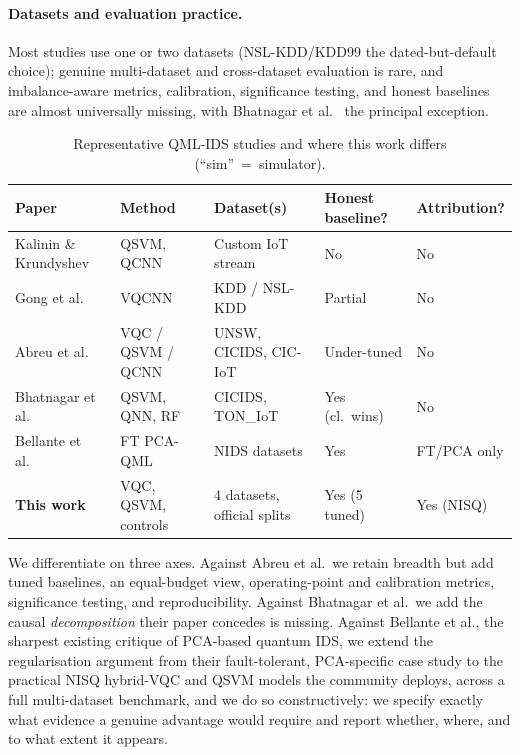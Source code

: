\documentclass[preprint,11pt]{elsarticle}
\begin{document}
\paragraph{Datasets and evaluation practice.}
Most studies use one or two datasets (NSL-KDD/KDD99 the dated-but-default choice); genuine
multi-dataset and cross-dataset evaluation is rare, and imbalance-aware metrics, calibration,
significance testing, and honest baselines are almost universally missing, with
Bhatnagar et al.~\cite{bhatnagar2026mqe} the principal exception.

\begin{table}[t]
\centering
\caption{Representative QML-IDS studies and where this work differs (``sim''~=~simulator).}
\label{tab:related}
\footnotesize
\renewcommand{\arraystretch}{1.2}
\setlength{\tabcolsep}{3pt}
\begin{tabularx}{\textwidth}{@{}L{2.25cm} L{2.1cm} Y C{1.85cm} C{1.95cm}@{}}
\toprule
\textbf{Paper} & \textbf{Method} & \textbf{Dataset(s)} & \textbf{Honest baseline?} & \textbf{Attribution?}\\
\midrule
Kalinin \& Krundyshev \cite{kalinin2022} & QSVM, QCNN & Custom IoT stream & No & No\\
\addlinespace[2pt]
Gong et al.~\cite{gong2024vqcnn} & VQCNN & KDD / NSL-KDD & Partial & No\\
\addlinespace[2pt]
Abreu et al.~\cite{abreu2024qmlids,abreu2025quantumnetsec} & VQC / QSVM / QCNN & UNSW, CICIDS, CIC-IoT & Under-tuned & No\\
\addlinespace[2pt]
Bhatnagar et al.~\cite{bhatnagar2026mqe} & QSVM, QNN, RF & CICIDS, TON\_IoT & Yes (cl.\ wins) & No\\
\addlinespace[2pt]
Bellante et al.~\cite{bellante2025pca} & FT PCA-QML & NIDS datasets & Yes & FT/PCA only\\
\addlinespace[2pt]
\textbf{This work} & VQC, QSVM, controls & 4 datasets, official splits & Yes (5 tuned) & Yes (NISQ)\\
\bottomrule
\end{tabularx}
\end{table}

We differentiate on three axes. Against Abreu et al.\ we retain breadth but add tuned baselines,
an equal-budget view, operating-point and calibration metrics, significance testing, and
reproducibility. Against Bhatnagar et al.\ we add the causal \emph{decomposition} their paper
concedes is missing. Against Bellante et al., the sharpest existing critique of PCA-based
quantum IDS, we
extend the regularisation argument from their fault-tolerant, PCA-specific case study to the
practical NISQ hybrid-VQC and QSVM models the community deploys, across a full multi-dataset
benchmark, and we do so constructively: we specify exactly what evidence a genuine advantage would
require and report whether, where, and to what extent it appears.
\end{document}
